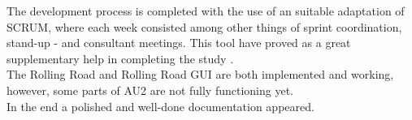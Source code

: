 The development process is completed with the use of an suitable adaptation of SCRUM, where each week consisted among other things of sprint coordination, stand-up - and consultant meetings. This tool have proved as a great
supplementary help in completing the study .\\
The Rolling Road and Rolling Road GUI are both implemented and working, however, some parts of AU2 are not fully functioning yet. \\

In the end a polished and well-done documentation appeared.